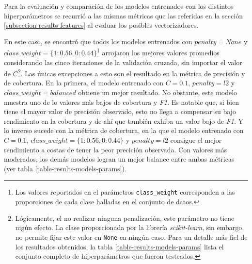 Para la evaluaci\'on y comparaci\'on de los modelos entrenados con los
distintos hiperpar\'ametros se recurri\'o a las mismas m\'etricas que las
referidas en la secci\'on \ref{subsection-results-features} al evaluar
los posibles vectorizadores.
\par
En este caso, se encontr\'o que todos los modelos
entrenados con $penalty=None$ y
$class\_weight=\lbrace1:0.56,0:0.44\rbrace$\footnote{Los valores
reportados en el par\'ametros \texttt{class\_weight} corresponden a
las proporciones de cada clase halladas en el conjunto de datos.}
arrojaron los mejores valores promedios considerando las cinco iteraciones
de la validaci\'on cruzada, sin importar el valor de $C$\footnote{
Lógicamente, el no realizar ninguna penalizaci\'on, este par\'ametro no tiene
nig\'un efecto. La clase proporcionada por la librer\'ia \textit{scikit-learn},
sin embargo, no permite fijar este valor en \texttt{None} en ning\'un caso.
Para un detalle m\'as fiel de los resultados obtenidos,
la tabla \ref{table-results-models-params} lista el conjunto completo de
hiperpar\'ametros que fueron testeados.}.
Las \'unicas excepciones a esto son el resultado en la
m\'etrica de precisi\'on y de cobertura. En la primera, el modelo entrenado con
$C=0.1$, $penalty=l2$ y $class\_weight=balanced$
obtiene un mejor resultado. No obstante, este modelo muestra uno de lo valores
m\'as bajos de cobertura y \textit{F1}. Es notable que, si bien tiene el mayor
valor de precisi\'on observado, esto no llega a compensar su bajo rendimiento
en la cobertura y de ah\'i que tambi\'en exhiba un valor bajo de \textit{F1}.
Y lo inverso sucede con la m\'etrica de cobertura, en la que el modelo
entrenado con $C=0.1$, $class\_weight=\lbrace1:0.56,0:0.44\rbrace$ y
$penalty=l2$ consigue el mejor rendimiento a costas de tener la peor precici\'on
observada.
Con valores m\'as moderados, los dem\'as modelos logran un mejor balance entre
ambas m\'etricas (ver tabla \ref{table-results-models-params}).


